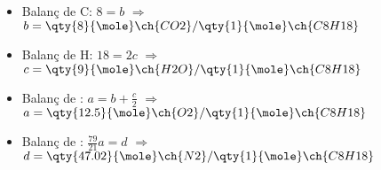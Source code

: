 \begin{mybox}[title=Determinació de la reacció teòrica de combustió del \textit{n}-octà amb aire]
    \begin{itemize}
        \item Balanç de C: \quad $8 = b$ \quad $\Rightarrow$ \quad $b = \qty{8}{\mole} \ch{CO2}/\qty{1}{\mole} \ch{C8H18}$
        \item Balanç de H: \quad $18 = 2c$ \quad $\Rightarrow$ \quad $c = \qty{9}{\mole} \ch{H2O}/\qty{1}{\mole} \ch{C8H18}$
        \item Balanç de : \quad $a = b + \frac{c}{2}$ \quad $\Rightarrow$ \quad $a = \qty{12.5}{\mole} \ch{O2}/\qty{1}{\mole} \ch{C8H18}$
        \item Balanç de : \quad $\frac{79}{21}a = d$ \quad $\Rightarrow$ \quad $d = \qty{47.02}{\mole} \ch{N2}/\qty{1}{\mole} \ch{C8H18}$
    \end{itemize}

\end{mybox}